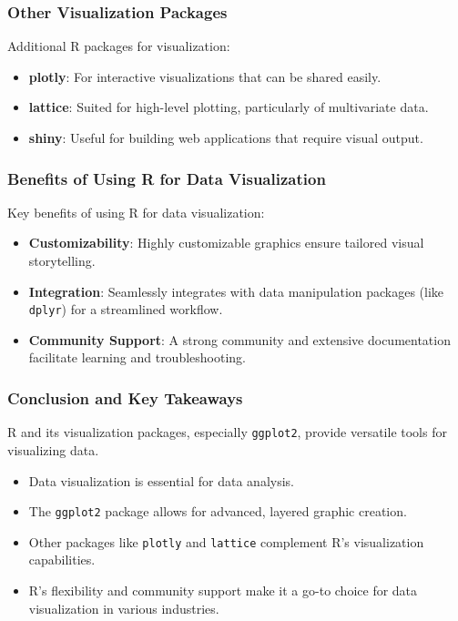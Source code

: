 \documentclass[aspectratio=169]{beamer}
\begin{document}
\begin{frame}[fragile]
    \frametitle{Other Visualization Packages}
    
    Additional R packages for visualization:
    \begin{itemize}
        \item \textbf{plotly}: For interactive visualizations that can be shared easily.
        \item \textbf{lattice}: Suited for high-level plotting, particularly of multivariate data.
        \item \textbf{shiny}: Useful for building web applications that require visual output.
    \end{itemize}
\end{frame}

\begin{frame}[fragile]
    \frametitle{Benefits of Using R for Data Visualization}
    
    Key benefits of using R for data visualization:
    \begin{itemize}
        \item \textbf{Customizability}: Highly customizable graphics ensure tailored visual storytelling.
        \item \textbf{Integration}: Seamlessly integrates with data manipulation packages (like \texttt{dplyr}) for a streamlined workflow.
        \item \textbf{Community Support}: A strong community and extensive documentation facilitate learning and troubleshooting.
    \end{itemize}
\end{frame}

\begin{frame}[fragile]
    \frametitle{Conclusion and Key Takeaways}
    
    R and its visualization packages, especially \texttt{ggplot2}, provide versatile tools for visualizing data. 
    \begin{itemize}
        \item Data visualization is essential for data analysis.
        \item The \texttt{ggplot2} package allows for advanced, layered graphic creation.
        \item Other packages like \texttt{plotly} and \texttt{lattice} complement R's visualization capabilities.
        \item R’s flexibility and community support make it a go-to choice for data visualization in various industries.
    \end{itemize}
\end{frame}
\end{document}
